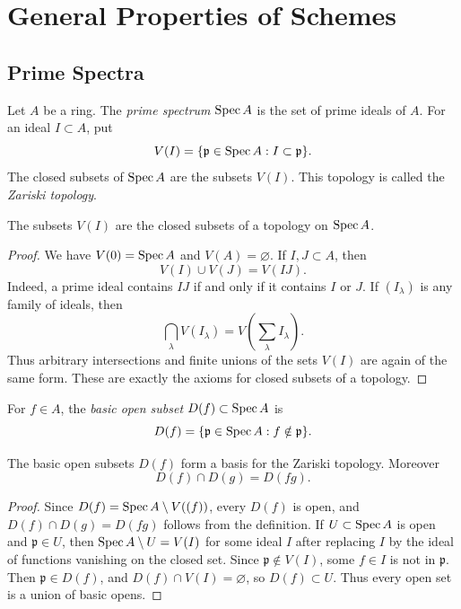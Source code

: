 \chapter{General Properties of Schemes}

\section{Prime Spectra}

\begin{definition}
Let \(A\) be a ring.  The \emph{prime spectrum} \(\operatorname{Spec} A\) is the set of prime
ideals of \(A\).  For an ideal \(I\subset A\), put
\[
    V(I)=\{\mathfrak p\in\operatorname{Spec} A: I\subset \mathfrak p\}.
\]
The closed subsets of \(\operatorname{Spec} A\) are the subsets \(V(I)\).  This topology is
called the \emph{Zariski topology}.
\end{definition}

\begin{proposition}
The subsets \(V(I)\) are the closed subsets of a topology on \(\operatorname{Spec} A\).
\end{proposition}

\begin{proof}
We have \(V(0)=\operatorname{Spec} A\) and \(V(A)=\varnothing\).  If \(I,J\subset A\), then
\[
    V(I)\cup V(J)=V(IJ).
\]
Indeed, a prime ideal contains \(IJ\) if and only if it contains \(I\) or
\(J\).  If \((I_\lambda)\) is any family of ideals, then
\[
    \bigcap_\lambda V(I_\lambda)=V\left(\sum_\lambda I_\lambda\right).
\]
Thus arbitrary intersections and finite unions of the sets \(V(I)\) are again
of the same form.  These are exactly the axioms for closed subsets of a
topology.
\end{proof}

\begin{definition}
For \(f\in A\), the \emph{basic open subset} \(D(f)\subset \operatorname{Spec} A\) is
\[
    D(f)=\{\mathfrak p\in\operatorname{Spec} A:f\notin\mathfrak p\}.
\]
\end{definition}

\begin{proposition}
The basic open subsets \(D(f)\) form a basis for the Zariski topology.  Moreover
\[
    D(f)\cap D(g)=D(fg).
\]
\end{proposition}

\begin{proof}
Since \(D(f)=\operatorname{Spec} A\setminus V((f))\), every \(D(f)\) is open, and
\(D(f)\cap D(g)=D(fg)\) follows from the definition.  If \(U\subset\operatorname{Spec} A\) is
open and \(\mathfrak p\in U\), then \(\operatorname{Spec} A\setminus U=V(I)\) for some ideal
\(I\) after replacing \(I\) by the ideal of functions vanishing on the closed
set.  Since \(\mathfrak p\notin V(I)\), some \(f\in I\) is not in
\(\mathfrak p\).  Then \(\mathfrak p\in D(f)\), and \(D(f)\cap V(I)=\varnothing\),
so \(D(f)\subset U\).  Thus every open set is a union of basic opens.
\end{proof}

